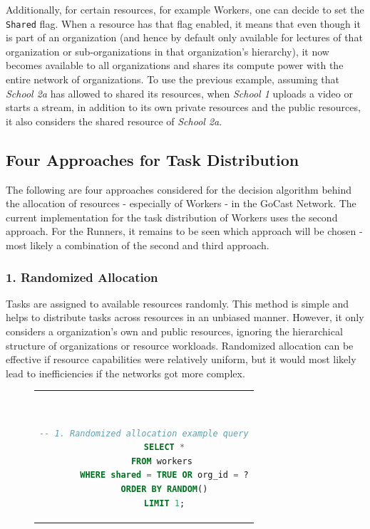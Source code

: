 Additionally, for certain resources, for example Workers, one can decide to set the \texttt{Shared} flag. When a resource has that flag enabled, it means that even though it is part of an organization (and hence by default only available for lectures of that organization or sub-organizations in that organization's hierarchy), it now becomes available to all organizations and shares its compute power with the entire network of organizations. To use the previous example, assuming that \textit{School 2a} has allowed to shared its resources, when \textit{School 1} uploads a video or starts a stream, in addition to its own private resources and the public resources, it also considers the shared resource of \textit{School 2a}.

\subsection{Four Approaches for Task Distribution}

The following are four approaches considered for the decision algorithm behind the allocation of resources - especially of Workers - in the GoCast Network. The current implementation for the task distribution of Workers uses the second approach. For the Runners, it remains to be seen which approach will be chosen - most likely a combination of the second and third approach. 

\subsubsection{1. Randomized Allocation}
     Tasks are assigned to available resources randomly. This method is simple and helps to distribute tasks across resources in an unbiased manner. However, it only considers a organization's own and public resources, ignoring the hierarchical structure of organizations or resource workloads. Randomized allocation can be effective if resource capabilities were relatively uniform, but it would most likely lead to inefficiencies if the networks got more complex.

    \begin{figure}[htpb]
      \begin{tabular}{c}
      \ \small \begin{lstlisting}[language=SQL]
        -- 1. Randomized allocation example query
        SELECT *
        FROM workers 
        WHERE shared = TRUE OR org_id = ?
        ORDER BY RANDOM()
        LIMIT 1;
        \end{lstlisting}
      \end{tabular}
      \label{fig:randomized-allocation}
    \end{figure}
    

